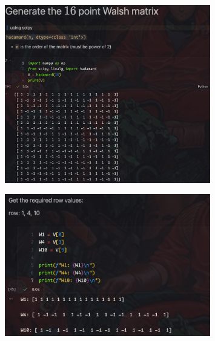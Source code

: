 \documentclass{article}
\begin{document}
\begin{figure}[H]
    \centering
    \includegraphics[width=0.8\textwidth]{HW5_img/7/gen_walsh.png}
\end{figure}

\begin{figure}[H]
    \centering
    \includegraphics[width=0.8\textwidth]{HW5_img/7/get_required_row.png}
\end{figure}
\end{document}
